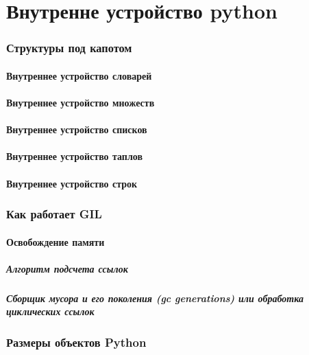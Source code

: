 \part{Внутренне устройство python}

\section{Структуры под капотом}

\subsection{Внутреннее устройство словарей}
\subsection{Внутреннее устройство множеств}
\subsection{Внутреннее устройство списков}
\subsection{Внутреннее устройство таплов}
\subsection{Внутреннее устройство строк}

\section{Как работает GIL}

\subsection{Освобождение памяти}

\subsubsection{Алгоритм подсчета ссылок}
\subsubsection{Сборщик мусора и его поколения (gc generations) или обработка циклических ссылок}

\section{Размеры объектов Python}


